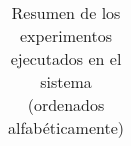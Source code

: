 \begin{table}[H]
\begin{adjustbox}{width=\textwidth}
\begin{tabular}{|p{3.8cm}|p{3.8cm}|p{4.2cm}|p{3.8cm}|p{2cm}|}
\end{tabular}
\end{adjustbox}
\caption{Resumen de los experimentos ejecutados en el sistema (ordenados alfabéticamente)}
\label{tab:resumen-experimentos}
\end{table}

